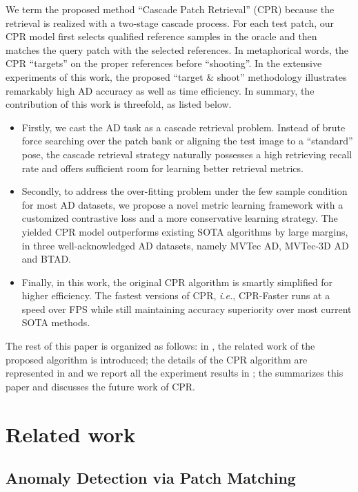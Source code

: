 \documentclass[lettersize,journal]{IEEEtran}
\begin{document}
We term the proposed method
``Cascade Patch Retrieval'' (CPR) because the retrieval is
realized with a two-stage cascade process. For each test patch, our CPR model first
selects qualified reference samples in the oracle and then matches the query patch with
the selected references. In metaphorical words, the CPR ``targets'' on the proper
references before ``shooting''. In the extensive experiments of this work, the proposed
``target \& shoot'' methodology illustrates remarkably high AD accuracy as well as time
efficiency. In summary, the contribution of this work is threefold, as listed below.
\begin{itemize}
  \item
        Firstly, we cast the AD task as a cascade retrieval problem. Instead of brute force
        searching over the patch bank or aligning the test image to a ``standard'' pose, the
        cascade retrieval strategy naturally possesses a high retrieving recall rate and
        offers sufficient room for learning better retrieval metrics.
  \item
        Secondly, to address the over-fitting problem under the few sample condition for
        most AD datasets, we propose a novel metric learning framework with a customized
        contrastive loss and a more conservative learning strategy. The yielded CPR model
        outperforms existing SOTA algorithms by large margins, in three
        well-acknowledged AD datasets, namely MVTec AD, MVTec-3D AD and BTAD.
  \item
        Finally, in this work, the original CPR algorithm is smartly simplified for higher
        efficiency. The fastest versions of CPR, \emph{i.e.}, CPR-Faster runs at a speed
        over  FPS while still maintaining accuracy superiority over most current SOTA
        methods.
\end{itemize}

The rest of this paper is organized as follows: in , the related work
of the proposed algorithm is introduced; the details of the CPR algorithm are represented
in  and we report all the experiment results in ;
the  summarizes this paper and discusses the future work of CPR.

\section{Related work}
\label{sec:related}

\subsection{Anomaly Detection via Patch Matching}
\label{subsec:matching}
\end{document}
